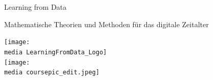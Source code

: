 \documentclass{newlayout}
\newcommand{\media}{media/}
\begin{document}
%
\setcounter{page}{3}

\setcounter{tocdepth}{1}
\tableofcontents

\setcounter{secnumdepth}{1}

\setcounter{page}{7}
\setcounter{chapter}{0}


\begin{coursetitle}
  \centerline{Learning from Data} 
  \bigskip
  \Large \centerline{Mathematische Theorien und Methoden für das digitale Zeitalter}
  \bigskip
 \texttt{[image: \\media LearningFromData\_Logo]}\\
  \bigskip
  \texttt{[image: \\media coursepic\_edit.jpeg]}
\end{coursetitle}









%

















\onecolumn
\end{document}
